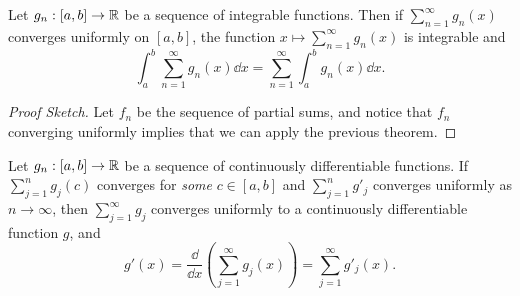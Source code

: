 \documentclass[a4paper]{scrartcl}
\begin{document}
\begin{theorem}
    Let $g_n: [a, b] \rightarrow \mathbb{R}$ be a sequence of integrable functions. Then if $\sum_{n = 1}^{\infty} g_n(x)$ converges uniformly on $[a, b]$, the function $x \mapsto \sum_{n = 1}^{\infty} g_n(x)$ is integrable and
    $$
    \int_a^b \sum_{n = 1}^{\infty} g_n(x) \dd x = \sum_{n = 1}^{\infty} \int_a^b g_n(x) \dd x.
    $$
\end{theorem}
\begin{proof}[Proof Sketch]
    Let $f_n$ be the sequence of partial sums, and notice that $f_n$ converging uniformly implies that we can apply the previous theorem.
\end{proof}

\begin{theorem}
    Let $g_n: [a, b] \rightarrow \mathbb{R}$ be a sequence of continuously differentiable functions. If $\sum_{j = 1}^n g_j(c)$ converges for \emph{some} $c \in [a, b]$ and $\sum_{j = 1}^n g'_j$ converges uniformly as $n \rightarrow \infty$, then $\sum_{j = 1}^{\infty} g_j$ converges uniformly to a continuously differentiable function $g$, and
    $$
   g'(x) = \frac{\dd}{\dd x} \left(\sum_{j = 1}^{\infty} g_j(x)\right) = \sum_{j = 1}^{\infty} g'_j(x).
    $$
\end{theorem}
\end{document}
